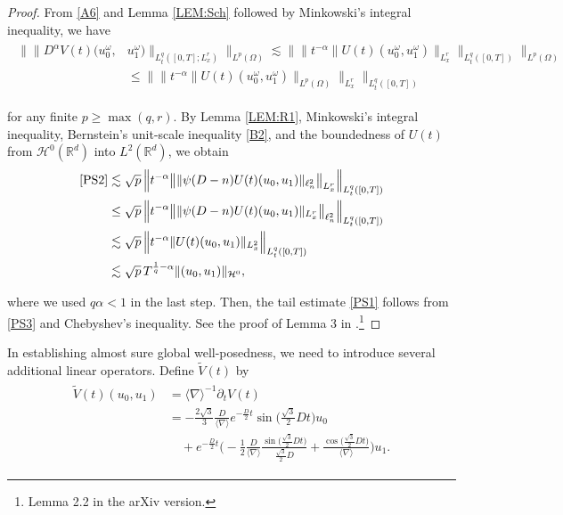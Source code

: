 \documentclass[letterpaper, 11pt,  reqno]{amsart}
\newcommand{\1}{\hspace{0.5mm}\text{I}\hspace{0.2mm}}
\newcommand{\noi}{\noindent}
\newcommand{\R}{\mathbb{R}}
\newcommand{\al}{\alpha}
\newcommand{\nb}{\nabla}
\newcommand{\wt}{\widetilde}
\newcommand{\dt}{\partial_t}
\renewcommand{\l}{\ell}
\renewcommand{\o}{\omega}
\renewcommand{\O}{\Omega}
\newcommand{\les}{\lesssim}
\newcommand{\jb}[1]
{\langle #1 \rangle}
\renewcommand{\H}{\mathcal{H}}
\numberwithin{equation}{section}
\numberwithin{theorem}{section}
\begin{document}
\begin{proof}

From \eqref{A6} and 
Lemma \ref{LEM:Sch}
followed by Minkowski's integral inequality, we have 
\begin{align}
\begin{split}
\Big\| \|D^\al V(t) (u_0^\o,&  u_1^\o) \|_{L^q_t([0, T]; L^r_x)} \Big\|_{L^p(\O)}
 \les 
\Big\| \big\| t^{-\al} \|U (t) (u_0^\o, u_1^\o) \|_{L^r_x} \big\|_{L^q_t([0, T])}\Big\|_{L^p(\O)}\\
& \leq 
\Big \| \big\| t^{-\al} \|U (t) (u_0^\o, u_1^\o) \|_{L^p(\O)} \big\|_{L^r_x} \Big\|_{L^q_t([0, T])}
\end{split}
\label{PS2}
\end{align}


\noi
for any finite $p \geq \max (q, r)$.
By 
Lemma \ref{LEM:R1}, 
Minkowski's integral inequality, 
Bernstein's unit-scale inequality \eqref{B2}, 
 and 
the boundedness of $U(t)$ from $\H^0(\R^d)$ into $L^2(\R^d)$,
we obtain
\begin{align}
\begin{split}
\eqref{PS2} & \les \sqrt{p}\, 
\Big \| t^{-\al} \big\|  \|\psi(D-n)  U(t) (u_0, u_1)  \|_{\l^2_n} \big\|_{L^r_x} \Big\|_{L^q_t([0, T])}\\
& \leq \sqrt{p}\, 
\Big \| t^{-\al} \big\|  \|\psi(D-n)  U(t) (u_0, u_1)  \|_{L^r_x} \big\|_{\l^2_n} \Big\|_{L^q_t([0, T])}\\
& \les \sqrt{p}\, 
\Big \| t^{-\al} \|    U(t) (u_0, u_1)  \|_{L^2_x} \Big\|_{L^q_t([0, T])}\\
& \les \sqrt{p} \, T^{\frac 1q - \al} 
 \|   (u_0, u_1)  \|_{\H^0}, 
\end{split}
\label{PS3}
\end{align}

\noi
where we used $q\al < 1$ in the last step.
Then, the tail estimate \eqref{PS1} follows
from \eqref{PS3} and Chebyshev's inequality.
See the proof of Lemma 3 in \cite{BOP1}.\footnote{Lemma 2.2 in the arXiv version.}
\end{proof}



In establishing almost sure global well-posedness, 
we need to introduce several additional linear operators.
  Define  $\wt V(t)  $  by 
\begin{align}
\begin{split}
\wt V(t) (u_0, u_1)
& = \jb{\nb}^{-1} \dt V(t) \\
& =  - \frac{2\sqrt 3}{3}\frac{D}{\jb{\nb}} e^{- \frac{D}{2}t} 
\sin \big(\tfrac{\sqrt{3}}{2} Dt\big) u_0\\
& \quad 
+ 
e^{- \frac{D}{2}t}
\bigg(-\frac 12 \frac{D}{\jb{\nb}}\frac{\sin \big(\tfrac{\sqrt{3}}{2} Dt\big)}{\tfrac{\sqrt{3}}{2} D}
+ \frac{\cos \big(\tfrac{\sqrt{3}}{2} Dt\big)}{\jb{\nb}}
\bigg)
 u_1.
 \end{split}
\label{z3}
\end{align}
\end{document}

